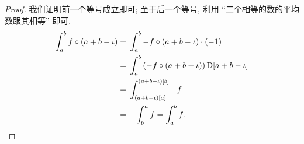 \begin{proof}
    我们证明前一个等号成立即可;
    至于后一个等号, 利用
    ``二个相等的数的平均数跟其相等''
    即可.
    \begin{align*}
        \int_{a}^{b} {f \circ (a + b - \iota)}
        = {} & \int_{a}^{b} {-f \circ (a + b - \iota) \cdot (-1)}                    \\
        = {} & \int_{a}^{b} {(-f \circ (a + b - \iota))\,\mathrm{D} [a + b - \iota]} \\
        = {} & \int_{(a + b - \iota)[a]}^{(a + b - \iota)[b]} {-f}                   \\
        = {} & {-\int_{b}^{a} {f}}
        = \int_{a}^{b} {f}. \qedhere
    \end{align*}
\end{proof}

